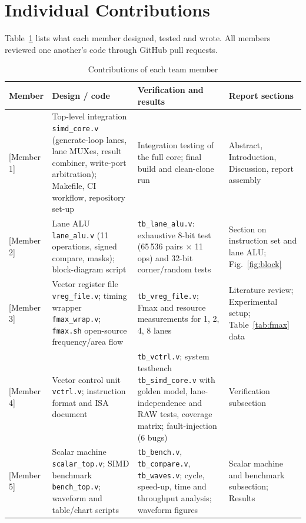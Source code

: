 \documentclass[conference]{IEEEtran}
\begin{document}
\section{Individual Contributions}
Table~\ref{tab:contrib} lists what each member designed, tested and wrote. All members reviewed one another's code through GitHub pull requests.

\begin{table}[t]\centering\caption{Contributions of each team member}\label{tab:contrib}
\renewcommand{\arraystretch}{1.2}
\begin{tabular}{@{}p{}p{}p{}p{}@{}}\toprule
Member & Design / code & Verification and results & Report sections\\\midrule
{[Member 1]} & Top-level integration \texttt{simd\_core.v} (generate-loop lanes, lane MUXes, result combiner, write-port arbitration); Makefile, CI workflow, repository set-up & Integration testing of the full core; final build and clean-clone run & Abstract, Introduction, Discussion, report assembly\\
{[Member 2]} & Lane ALU \texttt{lane\_alu.v} (11 operations, signed compare, masks); block-diagram script & \texttt{tb\_lane\_alu.v}: exhaustive 8-bit test (65\,536 pairs $\times$ 11 ops) and 32-bit corner/random tests & Section on instruction set and lane ALU; Fig.~\ref{fig:block}\\
{[Member 3]} & Vector register file \texttt{vreg\_file.v}; timing wrapper \texttt{fmax\_wrap.v}; \texttt{fmax.sh} open-source frequency/area flow & \texttt{tb\_vreg\_file.v}; Fmax and resource measurements for 1, 2, 4, 8 lanes & Literature review; Experimental setup; Table~\ref{tab:fmax} data\\
{[Member 4]} & Vector control unit \texttt{vctrl.v}; instruction format and ISA document & \texttt{tb\_vctrl.v}; system testbench \texttt{tb\_simd\_core.v} with golden model, lane-independence and RAW tests, coverage matrix; fault-injection (6 bugs) & Verification subsection\\
{[Member 5]} & Scalar machine \texttt{scalar\_top.v}; SIMD benchmark \texttt{bench\_top.v}; waveform and table/chart scripts & \texttt{tb\_bench.v}, \texttt{tb\_compare.v}, \texttt{tb\_waves.v}; cycle, speed-up, time and throughput analysis; waveform figures & Scalar machine and benchmark subsection; Results\\\bottomrule
\end{tabular}\end{table}
\end{document}
